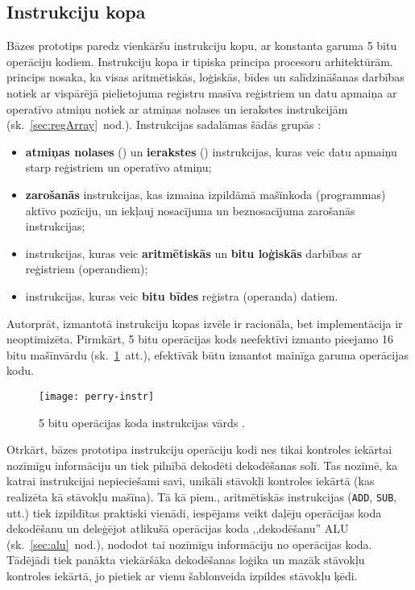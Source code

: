 \subsection{Instrukciju kopa} \label{sec:perry-instr}
	Bāzes prototips paredz vienkāršu instrukciju kopu, ar konstanta garuma
	5 bitu operāciju kodiem. Instrukciju kopa ir tipiska 
	principa procesoru arhitektūrām.  princips nosaka, ka
	visas aritmētiskās, loģiskās, bīdes un salīdzināšanas darbības notiek
	ar vispārējā pielietojuma reģistru masīva reģistriem un datu apmaiņa ar
	operatīvo atmiņu notiek ar atmiņas nolases un ierakstes instrukcijām
	\cite[11.~lpp.]{Flynn-arch}	(sk.~\ref{sec:regArray}~nod.).
	Instrukcijas sadalāmas šādās grupās \cite[291.~lpp.]{Perry-VHDL}:
	\begin{itemize}
		\item \textbf{atmiņas nolases} () un \textbf{ierakstes}
			() instrukcijas, kuras
			veic datu apmaiņu starp reģistriem un operatīvo atmiņu;
		\item \textbf{zarošanās} instrukcijas, kas izmaina
			izpildāmā mašīnkoda (programmas) aktīvo pozīciju, un iekļauj
			nosacījuma un beznosacījuma zarošanās instrukcijas;
		\item instrukcijas, kuras veic \textbf{aritmētiskās} un 
			\textbf{bitu loģiskās} darbības ar reģistriem (operandiem);
		\item instrukcijas, kuras veic \textbf{bitu bīdes} reģistra
			(operanda) datiem.
	\end{itemize}
	
	Autorprāt, izmantotā instrukciju kopas izvēle ir racionāla, bet
	implementācija ir neoptimizēta. Pirmkārt, 5 bitu operācijas kods
	neefektīvi izmanto pieejamo 16 bitu mašīnvārdu
	(sk.~\ref{fig:5bit-opcode}~att.), efektīvāk būtu izmantot mainīga
	garuma operācijas kodu.
	\begin{figure}[thb]
		\centering
		\texttt{[image: perry-instr]}
		\caption[5 bitu operācijas koda instrukcijas vārds.]
		        {5 bitu operācijas koda instrukcijas vārds \cite[292.~lpp.]{Perry-VHDL}.}
		\label{fig:5bit-opcode}
	\end{figure}
	
	Otrkārt, bāzes prototipa instrukciju operāciju kodi nes tikai kontroles
	iekārtai nozīmīgu informāciju un tiek pilnībā dekodēti dekodēšanas solī.
	Tas nozīmē, ka katrai instrukcijai nepieciešami savi, unikāli stāvokļi
	kontroles iekārtā (kas realizēta kā stāvokļu mašīna). Tā kā piem., 
	aritmētiskās instrukcijas (\texttt{ADD}, \texttt{SUB}, utt.)
	tiek izpildītas praktiski vienādi, iespējams veikt daļēju operācijas
	koda dekodēšanu un deleģējot atlikušā operācijas koda ,,dekodēšanu''
	ALU (sk.~\ref{sec:alu}~nod.), nododot tai nozīmīgu informāciju no
	operācijas koda. Tādējādi tiek panākta viekāršāka dekodēšanas loģika un 
	mazāk stāvokļu kontroles iekārtā, jo pietiek ar vienu šablonveida
	izpildes stāvokļu ķēdi.
	
